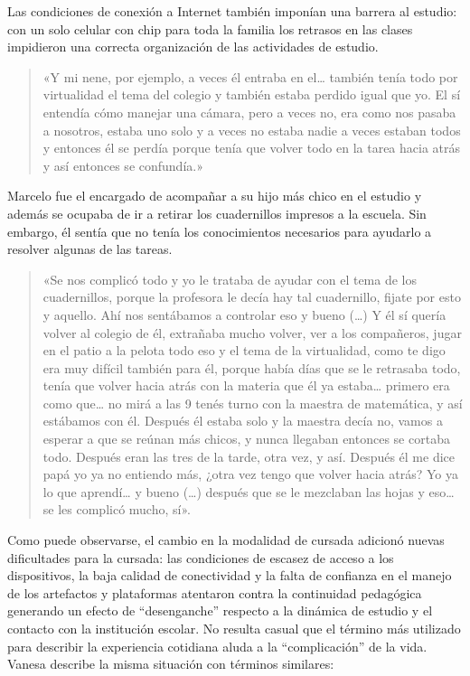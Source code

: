 Las condiciones de conexión a Internet también imponían una barrera al estudio: con un solo celular con chip para toda la familia los retrasos en las clases impidieron una correcta organización de las actividades de estudio.

\begin{quote}
«Y mi nene, por ejemplo, a veces él entraba en el\ldots{} también tenía todo por virtualidad el tema del colegio y también estaba perdido igual que yo. El sí entendía cómo manejar una cámara, pero a veces no, era como nos pasaba a nosotros, estaba uno solo y a veces no estaba nadie a veces estaban todos y entonces él se perdía porque tenía que volver todo en la tarea hacia atrás y así entonces se confundía.»
\end{quote}

Marcelo fue el encargado de acompañar a su hijo más chico en el estudio y además se ocupaba de ir a retirar los cuadernillos impresos a la escuela. Sin embargo, él sentía que no tenía los conocimientos necesarios para ayudarlo a resolver algunas de las tareas.

\begin{quote}
«Se nos complicó todo y yo le trataba de ayudar con el tema de los cuadernillos, porque la profesora le decía hay tal cuadernillo, fijate por esto y aquello. Ahí nos sentábamos a controlar eso y bueno (\ldots) Y él sí quería volver al colegio de él, extrañaba mucho volver, ver a los compañeros, jugar en el patio a la pelota todo eso y el tema de la virtualidad, como te digo era muy difícil también para él, porque había días que se le retrasaba todo, tenía que volver hacia atrás con la materia que él ya estaba\ldots{} primero era como que\ldots{} no mirá a las 9 tenés turno con la maestra de matemática, y así estábamos con él. Después él estaba solo y la maestra decía no, vamos a esperar a que se reúnan más chicos, y nunca llegaban entonces se cortaba todo. Después eran las tres de la tarde, otra vez, y así. Después él me dice papá yo ya no entiendo más, ¿otra vez tengo que volver hacia atrás? Yo ya lo que aprendí\ldots{} y bueno (\ldots) después que se le mezclaban las hojas y eso\ldots{} se les complicó mucho, sí».
\end{quote}

Como puede observarse, el cambio en la modalidad de cursada adicionó nuevas dificultades para la cursada: las condiciones de escasez de acceso a los dispositivos, la baja calidad de conectividad y la falta de confianza en el manejo de los artefactos y plataformas atentaron contra la continuidad pedagógica generando un efecto de ``desenganche'' respecto a la dinámica de estudio y el contacto con la institución escolar. No resulta casual que el término más utilizado para describir la experiencia cotidiana aluda a la ``complicación'' de la vida. Vanesa describe la misma situación con términos similares:

